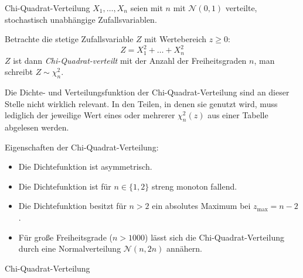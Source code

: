 \begin{defi}{Chi-Quadrat-Verteilung}
    $X_1, \ldots, X_n$ seien mit $n$ mit $\mathcal{N}(0, 1)$ verteilte, stochastisch unabhängige Zufallsvariablen.

    Betrachte die stetige Zufallsvariable $Z$ mit Wertebereich $z \geq 0$:
    \[
        Z = X_1^2 + \ldots + X_n^2
    \]
    $Z$ ist dann \emph{Chi-Quadrat-verteilt} mit der Anzahl der Freiheitsgraden $n$, man schreibt $Z \sim \chi^2_n$.

    Die Dichte- und Verteilungsfunktion der Chi-Quadrat-Verteilung sind an dieser Stelle nicht wirklich relevant.
    In den Teilen, in denen sie genutzt wird, muss lediglich der jeweilige Wert eines oder mehrerer $\chi^2_n (z)$ aus einer Tabelle abgelesen werden.

    Eigenschaften der Chi-Quadrat-Verteilung:
    \begin{itemize}
        \item Die Dichtefunktion ist asymmetrisch.
        \item Die Dichtefunktion ist für $n \in \{ 1, 2 \}$ streng monoton fallend.
        \item Die Dichtefunktion besitzt für $n > 2$ ein absolutes Maximum bei $z_{\max} = n-2$.
        \item Für große Freiheitsgrade ($n > 1000$) lässt sich die Chi-Quadrat-Verteilung durch eine Normalverteilung $\mathcal{N} (n, 2n)$ annähern.
    \end{itemize}
\end{defi}

\begin{example}{Chi-Quadrat-Verteilung}
    \begin{center}
    \end{center}
\end{example}

